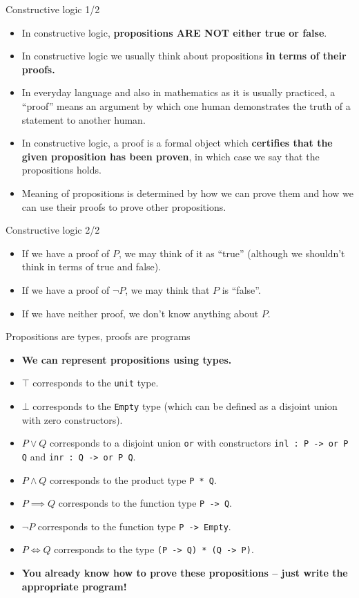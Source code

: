 \documentclass{beamer}
\newcommand{\m}[1]{\texttt{#1}}
\begin{document}
\begin{frame}{Constructive logic 1/2}
\begin{itemize}
	\item In constructive logic, \textbf{propositions ARE NOT either true or false}.
	\item In constructive logic we usually think about propositions \textbf{in terms of their proofs.}
	\item In everyday language and also in mathematics as it is usually practiced, a ``proof'' means an argument by which one human demonstrates the truth of a statement to another human.
	\item In constructive logic, a proof is a formal object which \textbf{certifies that the given proposition has been proven}, in which case we say that the propositions holds.
	\item Meaning of propositions is determined by how we can prove them and how we can use their proofs to prove other propositions.
\end{itemize}
\end{frame}

\begin{frame}{Constructive logic 2/2}
\begin{itemize}
	\item If we have a proof of $P$, we may think of it as ``true'' (although we shouldn't think in terms of true and false).
	\item If we have a proof of $\neg P$, we may think that $P$ is ``false''.
	\item If we have neither proof, we don't know anything about $P$.
\end{itemize}
\end{frame}

\begin{frame}{Propositions are types, proofs are programs}
\begin{itemize}
	\item \textbf{We can represent propositions using types.}
	\item $\top$ corresponds to the \m{unit} type.
	\item $\bot$ corresponds to the \m{Empty} type (which can be defined as a disjoint union with zero constructors).
	\item $P \lor Q$ corresponds to a disjoint union \m{or} with constructors \m{inl :\ P -> or P Q} and \m{inr :\ Q -> or P Q}.
	\item $P \land Q$ corresponds to the product type \m{P * Q}.
	\item $P \implies Q$ corresponds to the function type \m{P -> Q}.
	\item $\neg P$ corresponds to the function type \m{P -> Empty}.
	\item $P \iff Q$ corresponds to the type \m{(P -> Q) * (Q -> P)}.
	\item \textbf{You already know how to prove these propositions -- just write the appropriate program!}
\end{itemize}
\end{frame}
\end{document}
